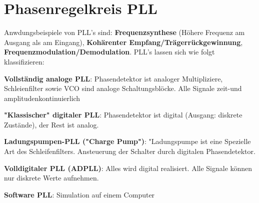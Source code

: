\raggedright
\section {Phasenregelkreis PLL}
Anwdungsbeispiele von PLL's sind: \textbf{Frequenzsynthese} (Höhere Frequenz am Ausgang als am Eingang), \textbf{Kohärenter Empfang/Trägerrückgewinnung}, \textbf{Frequenzmodulation/Demodulation}.  PLL's lassen sich wie folgt klassifizieren:\\
\begin{compactenum}
    \item \textbf{Vollständig analoge PLL}: Phasendetektor ist analoger Multipliziere, Schleienfilter sowie VCO sind analoge Schaltungsblöcke. Alle Signale zeit-und amplitudenkontinuierlich
    \item \textbf{"Klassischer" digitaler PLL}: Phasendetektor ist digital (Ausgang: diskrete Zustände), der Rest ist analog.
    \item \textbf{Ladungspumpen-PLL ("Charge Pump")}: "Ladungspumpe ist eine Spezielle Art des Schleifenfilters. Ansteuerung der Schalter durch  digitalen Phasendetektor.
    \item \textbf{Volldigitaler PLL (ADPLL)}: Alles wird digital realisiert. Alle Signale können nur diskrete Werte aufnehmen.
    \item \textbf{Software PLL}: Simulation auf einem Computer
\end{compactenum}

